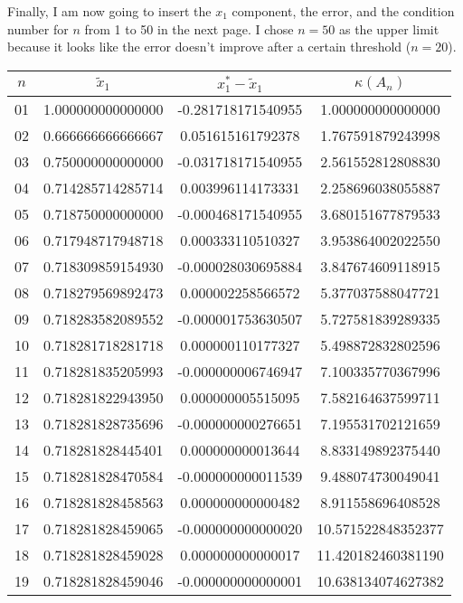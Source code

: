 \documentclass{article}
\begin{document}
Finally, I am now going to insert the $x_1$ component, the error, and the condition number for $n$ from 1 to 50 in the next page. I chose $n = 50$ as the upper limit because it looks like the error doesn't improve after a certain threshold ($n=20$).
\begin{table*}[htb]
\centering %
\begin{tabular}{c c c c} %
$n$ & $\widetilde{x}_1$ & $x_1^{\ast}- \widetilde{x}_1$ & $\kappa(A_n)$ \\ [0.65ex] %
\hline %
01 & 1.000000000000000 & -0.281718171540955 & 1.000000000000000 \\
02 & 0.666666666666667 & 0.051615161792378 & 1.767591879243998 \\
03 & 0.750000000000000 & -0.031718171540955 & 2.561552812808830 \\
04 & 0.714285714285714 & 0.003996114173331 & 2.258696038055887 \\
05 & 0.718750000000000 & -0.000468171540955 & 3.680151677879533 \\
06 & 0.717948717948718 & 0.000333110510327 & 3.953864002022550 \\
07 & 0.718309859154930 & -0.000028030695884 & 3.847674609118915 \\
08 & 0.718279569892473 & 0.000002258566572 & 5.377037588047721 \\
09 & 0.718283582089552 & -0.000001753630507 & 5.727581839289335 \\
10 & 0.718281718281718 & 0.000000110177327 & 5.498872832802596 \\
11 & 0.718281835205993 & -0.000000006746947 & 7.100335770367996 \\
12 & 0.718281822943950 & 0.000000005515095 & 7.582164637599711 \\
13 & 0.718281828735696 & -0.000000000276651 & 7.195531702121659 \\
14 & 0.718281828445401 & 0.000000000013644 & 8.833149892375440 \\
15 & 0.718281828470584 & -0.000000000011539 & 9.488074730049041 \\
16 & 0.718281828458563 & 0.000000000000482 & 8.911558696408528 \\
17 & 0.718281828459065 & -0.000000000000020 & 10.571522848352377 \\
18 & 0.718281828459028 & 0.000000000000017 & 11.420182460381190 \\
19 & 0.718281828459046 & -0.000000000000001 & 10.638134074627382 \\

\end{tabular}
\end{table*}
\end{document}
